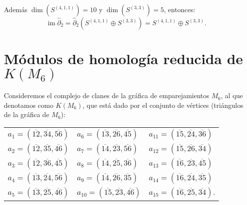 \documentclass[12pt]{book}
\theoremstyle{definition}
\DeclareMathOperator{\im}{im}
\newcounter{in}
\begin{document}
  Además $\dim(S^{(4,1,1)})=10$ y $\dim(S^{(3,3)})=5$, entonces:
  $$\im\widehat\partial_{2}=\widehat\partial_{2}(S^{(4,1,1)}\oplus
  S^{(3,3)})=S^{(4,1,1)}\oplus S^{(3,3)}.$$

\section{Módulos de homología reducida de $K(M_{6})$}
\label{hom-red-KM6}

Consideremos el complejo de clanes de la gráfica de emparejamientos
$M_{6}$, al que denotamos como $K(M_{6})$, que está dado por el
conjunto de vértices (triángulos de la gráfica de
$M_{6}$):

\begin{center}
  \begin{tabular}[h]{lll}
    $a_{1}=(\overline{12},\overline{34},\overline{56})$&$a_{6}=(\overline{13},\overline{26},\overline{45})$&$a_{11}=(\overline{15},\overline{24},\overline{36})$  \\
    $a_{2}=(\overline{12},\overline{35},\overline{46})$&$a_{7}=(\overline{14},\overline{23},\overline{56})$&$a_{12}=(\overline{15},\overline{26},\overline{34})$  \\
    $a_{3}=(\overline{12},\overline{36},\overline{45})$&$a_{8}=(\overline{14},\overline{25},\overline{36})$&$a_{13}=(\overline{16},\overline{23},\overline{45})$  \\
    $a_{4}=(\overline{13},\overline{24},\overline{56})$&$a_{9}=(\overline{14},\overline{26},\overline{35})$&$a_{14}=(\overline{16},\overline{24},\overline{35})$ \\
    $a_{5}=(\overline{13},\overline{25},\overline{46})$&$a_{10}=(\overline{15},\overline{23},\overline{46})$&$a_{15}=(\overline{16},\overline{25},\overline{34}).$  
  \end{tabular}
\end{center}
\end{document}
